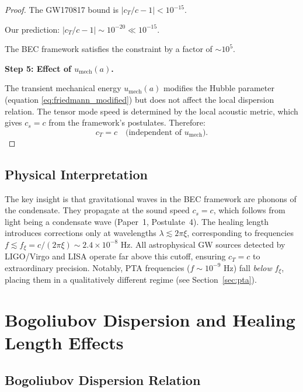\documentclass[11pt,a4paper]{article}
\newcommand{\cs}{\ensuremath{c_s}}
\newcommand{\cT}{\ensuremath{c_T}}
\newcommand{\umech}{\ensuremath{u_{\mathrm{mech}}}}
\theoremstyle{definition}
\theoremstyle{remark}
\begin{document}
\begin{proof}
The GW170817 bound is $|\cT/c - 1| < 10^{-15}$.

Our prediction: $|\cT/c - 1| \sim 10^{-20} \ll 10^{-15}$.

The BEC framework satisfies the constraint by a factor of $\sim 10^{5}$.

\textbf{Step 5: Effect of $\umech(a)$.}

The transient mechanical energy $\umech(a)$ modifies the Hubble parameter (equation \ref{eq:friedmann_modified}) but does not affect the local dispersion relation. The tensor mode speed is determined by the local acoustic metric, which gives $\cs = c$ from the framework's postulates. Therefore:
\begin{equation}
\cT = c \quad \text{(independent of } \umech).
\end{equation}
\end{proof}

\subsection{Physical Interpretation}
\label{sec:interpretation}

The key insight is that gravitational waves in the BEC framework are phonons of the condensate. They propagate at the sound speed $\cs = c$, which follows from light being a condensate wave (Paper~1, Postulate~4). The healing length introduces corrections only at wavelengths $\lambda \lesssim 2\pi\xi$, corresponding to frequencies $f \lesssim f_\xi = c/(2\pi\xi) \sim 2.4 \times 10^{-8}$ Hz. All astrophysical GW sources detected by LIGO/Virgo and LISA operate far above this cutoff, ensuring $\cT = c$ to extraordinary precision. Notably, PTA frequencies ($f \sim 10^{-9}$ Hz) fall \emph{below} $f_\xi$, placing them in a qualitatively different regime (see Section~\ref{sec:pta}).

\section{Bogoliubov Dispersion and Healing Length Effects}
\label{sec:dispersion}

\subsection{Bogoliubov Dispersion Relation}
\label{sec:bogoliubov}
\end{document}
